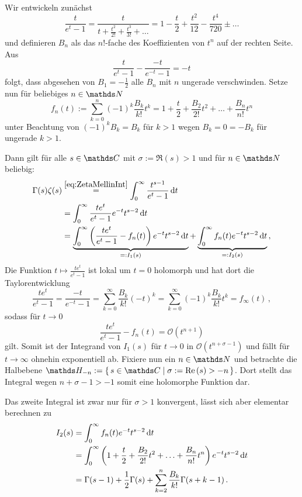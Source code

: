 \begin{bewe}
Wir entwickeln zunächst
\[
	\frac t{e^t - 1} = \frac t{t + \frac{t^2}{2!} + \frac {t^3}{3!} + \ldots} = 1 - \frac t2 + \frac {t^2}{12} - \frac {t^4}{720} \pm \ldots
\]
und definieren $B_n$ als das $n!$-fache des Koeffizienten von $t^n$ auf der rechten Seite. Aus
\[
	\frac t{e^t - 1} - \frac {-t}{e^{-t} - 1} = -t
\]
folgt, dass abgesehen von $B_1 = - \frac 12$ alle $B_n$ mit $n$ ungerade verschwinden. Setze nun für beliebiges $n \in \NN$
\[
	f_n(t) := \sum_{k=0}^n (-1)^k \frac {B_k}{k!} t^k = 1 + \frac t2 + \frac {B_2}{2!}t^2 + \ldots + \frac {B_n}{n!}t^n
\]
unter Beachtung von $(-1)^k B_k = B_k$ für $k > 1$ wegen $B_k = 0 = - B_k$ für ungerade $k > 1$. 

Dann gilt für alle $s \in \CC$ mit $\sigma := \Re(s) > 1$ und für $n \in \NN$ beliebig:
\begin{align*}
	\Gamma(s) \zeta(s) 
	&\overset{\eqref{eq:ZetaMellinInt}}= \int_0^\infty \frac {t^{s-1}}{e^t - 1} \,\mathrm{d} t \\
	&= \int_0^\infty \frac {te^t}{e^t - 1} e^{-t} t^{s-2} \,\mathrm{d} t \\
	&= \underbrace{\int_0^\infty \left( \frac {te^t}{e^t - 1} - f_n(t) \right) e^{-t} t^{s-2} \,\mathrm{d} t}_{=: I_1(s)} + \underbrace{\int_0^\infty f_n(t) e^{-t} t^{s-2} \,\mathrm{d} t}_{=: I_2(s)}
	\,,
\end{align*}
Die Funktion $t \mapsto \frac {te^t}{e^t - 1}$ ist lokal um $t = 0$ holomorph und hat dort die Taylorentwicklung
\[
	\frac {te^t}{e^t - 1} = \frac {-t}{e^{-t} - 1} = \sum_{k=0}^\infty \frac {B_k}{k!} (-t)^k = \sum_{k=0}^\infty (-1)^k \frac {B_k}{k!} t^k = f_\infty(t)
	\,,
\]
sodass für $t \to 0$
\[
	\frac {te^t}{e^t - 1} - f_n(t) = \mathcal O (t^{n+1})
\]
gilt. Somit ist der Integrand von $I_1(s)$ für $t \to 0$ in $\mathcal O (t^{n+\sigma-1})$ und fällt für $t \to \infty$ ohnehin exponentiell ab. Fixiere nun ein $n \in \NN$ und betrachte die Halbebene $\HH_{-n} := \Set {s \in \CC \mid \sigma := \Re(s) > -n}$. Dort stellt das Integral wegen $n+\sigma-1 > -1$ somit eine holomorphe Funktion dar.

Das zweite Integral ist zwar nur für $\sigma > 1$ konvergent, lässt sich aber elementar berechnen zu
\begin{align*}
	I_2(s) 
	&= \int_0^\infty f_n(t) e^{-t} t^{s-2} \,\mathrm{d} t \\
	&= \int_0^\infty \left( 1 + \frac t2 + \frac {B_2}{2!}t^2 + \ldots + \frac {B_n}{n!}t^n \right) e^{-t} t^{s-2} \,\mathrm{d} t \\
	&= \Gamma(s-1) + \frac 12 \Gamma(s) + \sum_{k=2}^n \frac {B_k}{k!} \Gamma(s+k-1)
	\,.
\end{align*}


\end{bewe}

